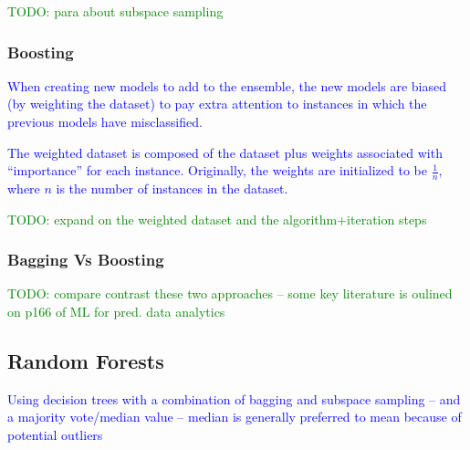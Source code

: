 \textcolor{green}{TODO: para about {subspace sampling}}

\subsubsection{Boosting}

\textcolor{blue}{When creating new models to add to the ensemble, the new models are biased (by weighting the dataset) to pay extra attention to instances in which the previous models have misclassified.}

\textcolor{blue}{The weighted dataset is composed of the dataset plus weights associated with ``importance'' for each instance. Originally, the weights are initialized to be $\frac{1}{n}$, where $n$ is the number of instances in the dataset.}

\textcolor{green}{TODO: expand on the weighted dataset and the algorithm+iteration steps}

\subsubsection{Bagging Vs Boosting}

\textcolor{green}{TODO: compare contrast these two approaches -- some key literature is oulined on p166 of ML for pred. data analytics}

\subsection{Random Forests}

\textcolor{blue}{Using decision trees with a combination of bagging and subspace sampling -- and a majority vote/median value -- median is generally preferred to mean because of potential outliers}
